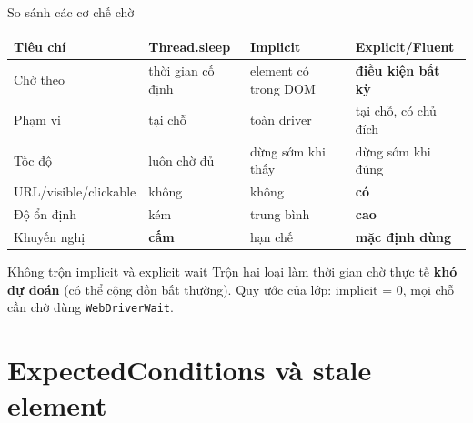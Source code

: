 \documentclass[aspectratio=169,12pt]{beamer}
\begin{document}
\begin{frame}{So sánh các cơ chế chờ}
  \begin{center}
  \footnotesize
  \begin{tabular}{p{3.4cm}p{3.1cm}p{3.0cm}p{2.6cm}}
    \toprule
    \textbf{Tiêu chí} & \textbf{Thread.sleep} & \textbf{Implicit}
      & \textbf{Explicit/Fluent} \\
    \midrule
    Chờ theo        & thời gian cố định & element có trong DOM
      & \textbf{điều kiện bất kỳ} \\
    Phạm vi         & tại chỗ           & toàn driver
      & tại chỗ, có chủ đích \\
    Tốc độ          & luôn chờ đủ       & dừng sớm khi thấy
      & dừng sớm khi đúng \\
    URL/visible/clickable & không       & không
      & \textbf{có} \\
    Độ ổn định      & kém               & trung bình
      & \textbf{cao} \\
    Khuyến nghị     & \textbf{cấm}      & hạn chế
      & \textbf{mặc định dùng} \\
    \bottomrule
  \end{tabular}
  \end{center}

  \begin{alertblock}{Không trộn implicit và explicit wait}
    Trộn hai loại làm thời gian chờ thực tế \textbf{khó dự đoán}
    (có thể cộng dồn bất thường). Quy ước của lớp: implicit = 0,
    mọi chỗ cần chờ dùng \texttt{WebDriverWait}.
  \end{alertblock}
\end{frame}

\section{ExpectedConditions và stale element}
\end{document}
